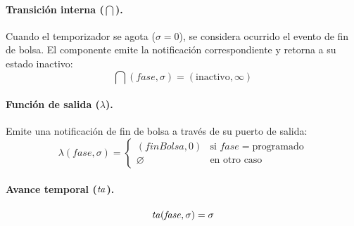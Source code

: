 \paragraph{Transición interna ($\dint$).}
Cuando el temporizador se agota ($\sigma = 0$), se considera ocurrido el evento de fin de bolsa. El componente emite la notificación correspondiente y retorna a su estado inactivo:
\[
\dint(\mathit{fase}, \sigma) = (\text{inactivo}, \infty)
\]

\paragraph{Función de salida ($\lambda$).}
Emite una notificación de fin de bolsa a través de su puerto de salida:
\[
\lambda(\mathit{fase}, \sigma) =
\begin{cases}
(\mathit{finBolsa}, 0) & \text{si } \mathit{fase} = \text{programado} \\[4pt]
\varnothing & \text{en otro caso}
\end{cases}
\]

\paragraph{Avance temporal ($\mathit{ta}$).}
\[
\mathit{ta}(\mathit{fase}, \sigma) = \sigma
\]
